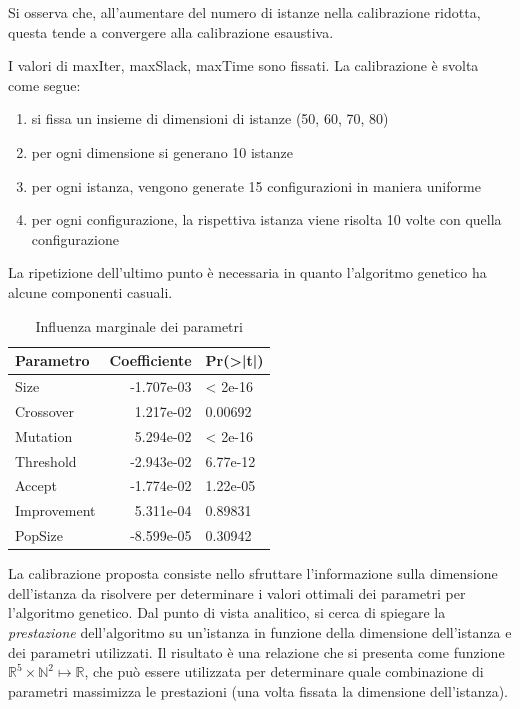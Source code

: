 \documentclass[a4paper, 10pt]{report}
\begin{document}
Si osserva che, all'aumentare del numero di istanze nella calibrazione
ridotta, questa tende a convergere alla calibrazione esaustiva.

I valori di maxIter, maxSlack, maxTime sono fissati. La calibrazione
è svolta come segue:
\begin{enumerate}
  \item si fissa un insieme di dimensioni di istanze (50, 60, 70, 80)
  \item per ogni dimensione si generano 10 istanze
  \item per ogni istanza, vengono generate 15 configurazioni in maniera
        uniforme
  \item per ogni configurazione, la rispettiva istanza viene risolta 10
        volte con quella configurazione
\end{enumerate}
La ripetizione dell'ultimo punto è necessaria in quanto l'algoritmo
genetico ha alcune componenti casuali.

\begin{table}
  \centering
  \begin{tabular}{|| l | r | l ||}
    \hline
    Parametro   & Coefficiente & Pr(>|t|) \\ \hline
    \hline
    Size        &   -1.707e-03 & < 2e-16  \\
    Crossover   &    1.217e-02 & 0.00692  \\
    Mutation    &    5.294e-02 & < 2e-16  \\
    Threshold   &   -2.943e-02 & 6.77e-12 \\
    Accept      &   -1.774e-02 & 1.22e-05 \\
    Improvement &    5.311e-04 & 0.89831  \\  
    PopSize     &   -8.599e-05 & 0.30942  \\ \hline
  \end{tabular}
  \caption{Influenza marginale dei parametri}
  \label{tab:parameters-marginal}
\end{table}

La calibrazione proposta consiste nello sfruttare l'informazione sulla
dimensione dell'istanza da risolvere per determinare i valori ottimali
dei parametri per l'algoritmo genetico. Dal punto di vista analitico,
si cerca di spiegare la \emph{prestazione} dell'algoritmo su un'istanza
in funzione della dimensione dell'istanza e dei parametri utilizzati. Il
risultato è una relazione che si presenta come funzione
$\mathbb R^5\times \mathbb N^2 \mapsto \mathbb R$, che può essere utilizzata per
determinare quale combinazione di parametri massimizza le prestazioni
(una volta fissata la dimensione dell'istanza).
\end{document}
